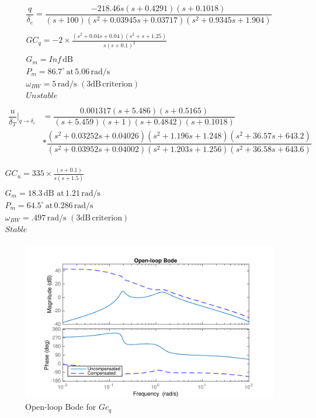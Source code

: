 \documentclass[12pt]{article}
\begin{document}
\begin{gather*}
\dfrac{q}{\delta_e} =\dfrac{-218.46 s (s+0.4291) (s+0.1018)} {(s+100) (s^2 + 0.03945s + 0.03717) (s^2 + 0.9345s + 1.904)} \\
\\
\boxed{GC_q = -2 \times \frac{(s^2 + 0.04s + 0.04) (s^2 + s + 1.25)}{s (s+0.1)^3}} \\
\\
G_m=Inf\,\mathrm{dB\,\,} \\
P_m=86.7^{\circ}\, \mathrm{at}\, 5.06 \,\mathrm{rad/s} \\
\omega_{BW}=5\, \mathrm{rad/s}\,\mathrm{\,(3 dB\, criterion)}\\
Unstable \\
\end{gather*}
\begin{gather*}
\begin{split}
\dfrac{u}{\delta_T}\biggr\rvert_{q \rightarrow \delta_e} & = \dfrac{0.001317 (s+5.486) (s+0.5165)}{(s+5.459) (s+1) (s+0.4842) (s+0.1018)} \\
                                                         & * \dfrac{(s^2 + 0.03252s + 0.04026) (s^2 + 1.196s + 1.248) (s^2 + 36.57s + 643.2)}{(s^2 + 0.03952s + 0.04002) (s^2 + 1.203s + 1.256) (s^2 + 36.58s + 643.6)} \\
\end{split}\\
\\
\boxed{GC_{u} = 335 \times \frac{(s+0.1)}{s (s+1.5)}} \\
\\
G_m=18.3\,\mathrm{dB\,\,} \mathrm{at}\, 1.21 \,\mathrm{rad/s}  \\
P_m=64.5^{\circ}\, \mathrm{at}\, 0.286 \,\mathrm{rad/s} \\
\omega_{BW}=.497\, \mathrm{rad/s}\,\mathrm{\,(3 dB\, criterion)}\\
Stable \\
\end{gather*}

\begin{figure}[h!]
\begin{center}
\includegraphics[width=.95\textwidth]{figures/openloop_gc1}
\caption{Open-loop Bode for $Gc_q$}
\end{center}
\end{figure}
\end{document}
